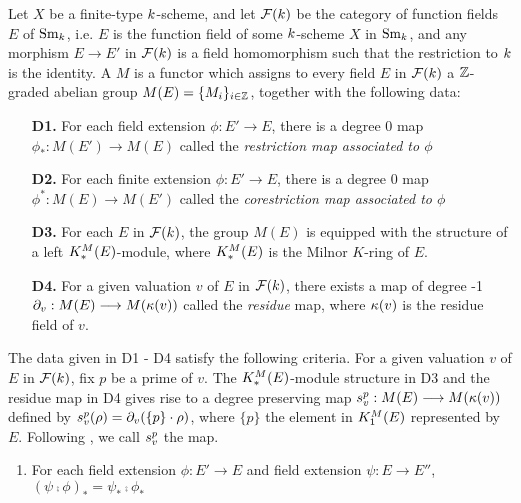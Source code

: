 \begin{defn}\label{def_pre_cycmod}
Let $X$ be a finite-type $k$-scheme, and let 
$\mathcal{F}(k)$ be the category of function fields $E$ of 
$\mathrm{Sm}_{k}$, i.e. $E$ is the function field of some $k$-scheme 
$X$ in $\mathrm{Sm}_{k}$, and any morphism $E \to E'$ in $\mathcal{F}(k)$
is a field homomorphism such that the restriction to $k$ 
is the identity. A  $M$ is a functor which 
assigns to every field $E$ in $\mathcal{F}(k)$ a $\mathbb{Z}$-graded abelian 
group $\displaystyle M(E) = \{M_i\}_{i \in \mathbb{Z}}$, together with
the following data:

\begin{enumerate}[label=\bfseries D\arabic*.]
\item[\textbf{D1.}] For each field extension $\phi: E' \to E$, 
there is a degree 0 map $\phi_*: M(E') \to M(E)$ called the 
\emph{restriction map associated to $\phi$}

\item[\textbf{D2.}] For each finite extension $\phi: E' \to E$, 
there is a degree 0 map $\phi^*: M(E) \to M(E')$ called the 
\emph{corestriction map associated to $\phi$}

\item[\textbf{D3.}] For each $E$ in $\mathcal{F}(k)$, the group $M(E)$ 
is equipped with the structure of a left $K^M_*(E)$-module, where
$K^M_*(E)$ is the Milnor $K$-ring of $E$.

\item[\textbf{D4.}] For a given valuation $v$ of $E$ in 
$\mathcal{F}(k)$, there exists a map of degree -1 $\partial_{v}: M(E) \longrightarrow 
M(\kappa(v))$ called the \emph{residue} map, where $\kappa(v)$ is 
the residue field of $v$.
\end{enumerate}

The data given in D1 - D4 satisfy the following criteria.
For a given valuation $v$ of $E$ in $\mathcal{F}(k)$,
fix $p$ be a prime of $v$. The $K^M_*(E)$-module structure
in D3 and the residue map in D4 gives
rise to a degree preserving map $s_{v}^{p} : M(E) \longrightarrow
M(\kappa(v))$ defined by $s_{v}^{p}(\rho) =
\partial_{v}(\{p\} \cdot \rho)$, where $\{p\}$ the element in 
$K^M_1(E)$ represented by $E$. Following \cite[1.1]{Rost96},
we call $s_{v}^{p}$ the  map.

\begin{enumerate}[label=\bfseries R1\alph*., leftmargin=3em]
\item For each field extension $\phi: E' \to E$ and 
field extension $\psi: E \to E''$, $(\psi \comp \phi)_* = \psi_* 
\comp \phi_*$


\end{enumerate}
\end{defn}
